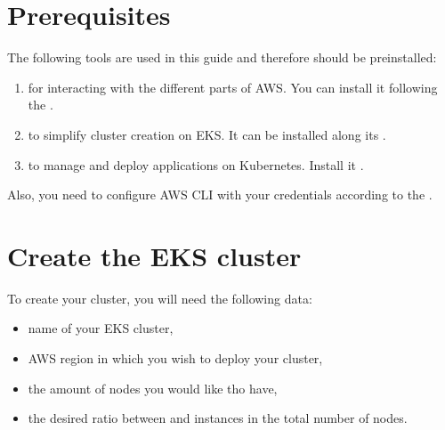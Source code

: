 \documentclass[letterpaper,10pt,english]{sphinxmanual}
\begin{document}
\section{Prerequisites}
\label{\detokenize{eks:prerequisites}}
The following tools are used in this guide and therefore should be preinstalled:
\begin{enumerate}
%
\item {} 
 for interacting with the different
parts of AWS. You can install it following the .

\item {} 
 to simplify cluster creation on EKS. It can be installed
along its .

\item {} 
  to manage and deploy applications on Kubernetes. Install
it .

\end{enumerate}

Also, you need to configure AWS CLI with your credentials according to the .


\section{Create the EKS cluster}
\label{\detokenize{eks:create-the-eks-cluster}}
To create your cluster, you will need the following data:
\begin{itemize}
\item {} 
name of your EKS cluster,

\item {} 
AWS region in which you wish to deploy your cluster,

\item {} 
the amount of nodes you would like tho have,

\item {} 
the desired ratio between  and  instances in the total number of nodes.

\end{itemize}
\end{document}
